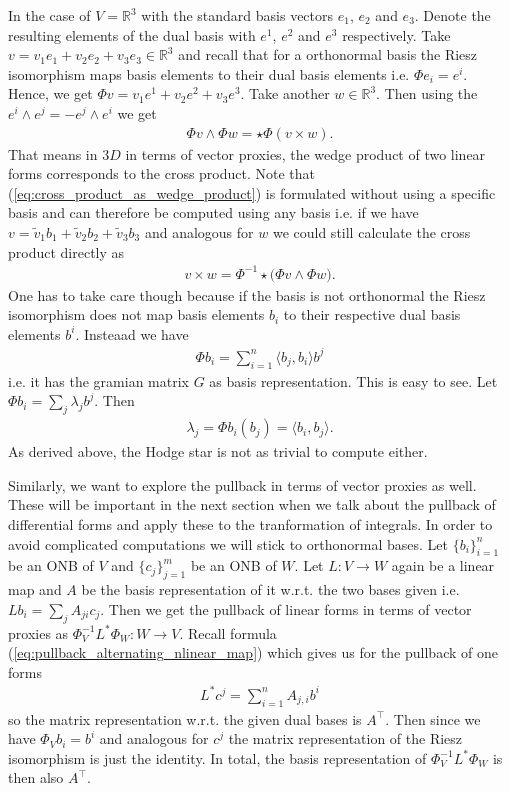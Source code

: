 \documentclass[12pt,a4paper]{article}
\numberwithin{equation}{subsection}
\numberwithin{lemma}{subsection}
\theoremstyle{definition}
\newcommand{\real}{\mathbb{R}}
\begin{document}
In the case of $V= \real^3$ with the standard basis
vectors $e_1$, $e_2$ and $e_3$. Denote the resulting elements 
of the dual basis with $e^1$, $e^2$ and $e^3$ respectively. 
Take $v = v_1 e_1 + v_2 e_2 + v_3 e_3 \in \real^3$ 
and recall that for a orthonormal basis the Riesz isomorphism maps basis 
elements to their dual basis elements i.e. $\Phi e_i = e^i$. Hence, 
we get $\Phi v = v_1 e^1 + v_2 e^2 + v_3 e^3$. Take another $w \in \real^3$.
Then using the $e^i \wedge e^j = - e^j \wedge e^i$ we get 
\begin{align}
    \Phi v \wedge \Phi w = \star \Phi (v \times w). 
    \label{eq:cross_product_as_wedge_product}
\end{align}
That means in $3D$ in terms of vector proxies, the wedge product 
of two linear forms corresponds to the cross product. Note that 
(\ref{eq:cross_product_as_wedge_product}) is formulated without using a 
specific basis and can therefore be computed using any basis i.e. 
if we have $v = \tilde{v}_1 b_1 + \tilde{v}_2 b_2 + \tilde{v}_3 b_3$ 
and analogous for $w$ we could still calculate the cross product directly as 
\begin{align*}
    v \times w = \Phi^{-1} \star \big(\Phi v \wedge \Phi w \big).
\end{align*}
One has to take care though because if the basis is not orthonormal 
the Riesz isomorphism does not map basis elements $b_i$ to their respective 
dual basis elements $b^i$. Insteaad we have 
\begin{align*}
    \Phi b_i = \sum_{i=1}^{n} \langle b_j, b_i \rangle b^j
\end{align*}
i.e. it has the gramian matrix $G$ as basis representation. 
This is easy to 
see. Let $\Phi b_i = \sum_j \lambda_j b^j$. Then
\begin{align*}
    \lambda_j = \Phi b_i (b_j) = \langle b_i, b_j \rangle.
\end{align*}
As derived above, the Hodge star is not as trivial to compute either.

Similarly, we want to explore the pullback in terms of vector proxies as well. 
These will be important in the next section when we talk about the pullback 
of differential forms and apply these to the tranformation of integrals.
In order to avoid complicated computations we will stick to orthonormal bases.
Let $\{ b_i \}_{i=1}^n$ be an ONB of $V$ and 
$\{ c_j \}_{j=1}^m$ be an ONB of $W$. Let $L : V \rightarrow W$ 
again be a linear map and $A$ be the basis representation of it w.r.t. 
the two bases given i.e. $L b_i = \sum_j A_{ji} c_j$. 
Then we get the pullback of linear forms in terms 
of vector proxies 
as $\Phi_V^{-1} L^* \Phi_W : W \rightarrow V$. Recall 
formula (\ref{eq:pullback_alternating_nlinear_map}) which 
gives us for the pullback of one forms 
\begin{align}
    L^* c^j = \sum_{i=1}^n A_{j,i} b^i \label{eq:pullback_linear_forms}
\end{align}
so the matrix representation w.r.t. the given dual bases is $A^\top$.
Then since we have $\Phi_V b_i = b^i$ and analogous for $c^j$
the matrix representation of the Riesz isomorphism is just the identity.
In total, the basis representation of $\Phi_V^{-1} L^* \Phi_W$ is then also 
$A^\top$.
\end{document}
